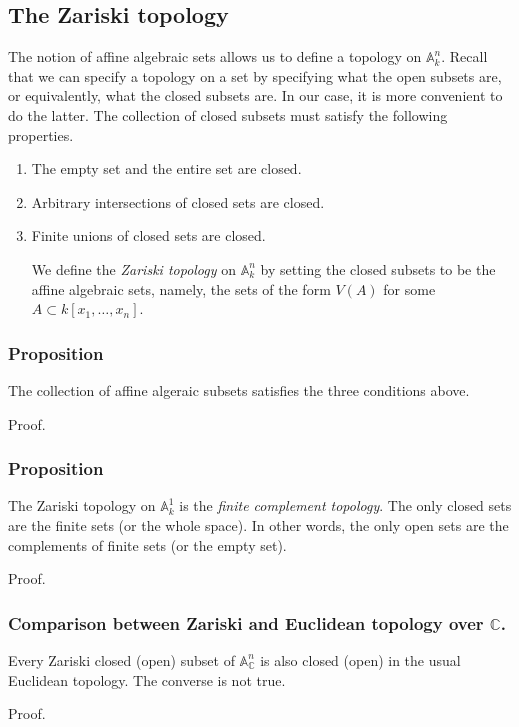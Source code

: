 \documentclass[11pt]{article}
\begin{document}
\subsection{The Zariski topology}
\label{sec:org274691d}
The notion of affine algebraic sets allows us to define a topology on \(\mathbb A^n_k\).
Recall that we can specify a topology on a set by specifying what the open subsets are, or equivalently, what the closed subsets are.
In our case, it is more convenient to do the latter.
The collection of closed subsets must satisfy the following properties.
\begin{enumerate}
\item The empty set and the entire set are closed.
\item Arbitrary intersections of closed sets are closed.
\item Finite unions of closed sets are closed.

We define the \emph{Zariski topology} on \(\mathbb A^n_k\) by setting the closed subsets to be the affine algebraic sets, namely, the sets of the form \(V(A)\) for some \(A \subset k[x_1,\dots,x_n]\).
\end{enumerate}
\subsubsection{Proposition}
\label{sec:org0b1feca}
The collection of affine algeraic subsets satisfies the three conditions above.

\begin{skipped}
Proof.
\end{skipped}

\subsubsection{Proposition}
\label{sec:orgf1568f5}
The Zariski topology on \(\mathbb A^1_k\) is the \emph{finite complement topology}.
The only closed sets are the finite sets (or the whole space).
In other words, the only open sets are the complements of finite sets (or the empty set).

\begin{skipped}
Proof.
\end{skipped}

\subsubsection{Comparison between Zariski and Euclidean topology over \(\mathbb C\).}
\label{sec:orgefc25ec}
Every Zariski closed (open) subset of \(\mathbb A^n_{\mathbb C}\) is also closed (open) in the usual Euclidean topology.
The converse is not true.
\begin{skipped}
Proof.
\end{skipped}
\end{document}
